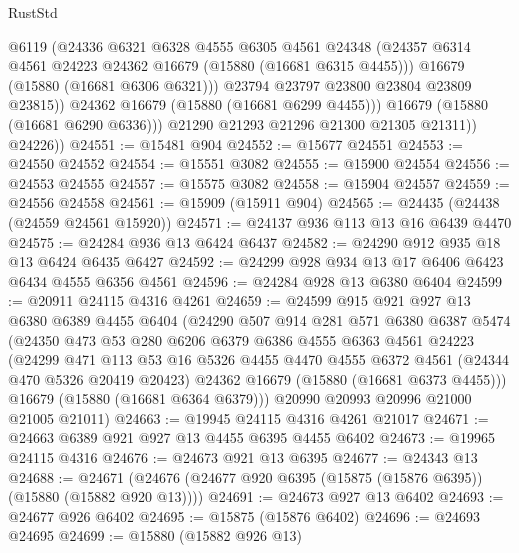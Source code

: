 \begin{lexlean}{RustStd}
\begin{coremodule}
                    @6119
                    (@24336
                      @6321
                      @6328
                      @4555
                      @6305
                      @4561
                      @24348
                      (@24357 @6314 @4561 @24223 @24362 @16679 (@15880 (@16681 @6315 @4455)))
                      @16679
                      (@15880 (@16681 @6306 @6321)))
                    @23794
                    @23797
                    @23800
                    @23804
                    @23809
                    @23815))
                @24362
                @16679
                (@15880 (@16681 @6299 @4455)))
              @16679
              (@15880 (@16681 @6290 @6336)))
            @21290
            @21293
            @21296
            @21300
            @21305
            @21311))
        @24226))
@24551 := @15481 @904
@24552 := @15677 @24551
@24553 := @24550 @24552
@24554 := @15551 @3082
@24555 := @15900 @24554
@24556 := @24553 @24555
@24557 := @15575 @3082
@24558 := @15904 @24557
@24559 := @24556 @24558
@24561 := @15909 (@15911 @904)
@24565 := @24435 (@24438 (@24559 @24561 @15920))
@24571 := @24137 @936 @113 @13 @16 @6439 @4470
@24575 := @24284 @936 @13 @6424 @6437
@24582 := @24290 @912 @935 @18 @13 @6424 @6435 @6427
@24592 := @24299 @928 @934 @13 @17 @6406 @6423 @6434 @4555 @6356 @4561
@24596 := @24284 @928 @13 @6380 @6404
@24599 := @20911 @24115 @4316 @4261
@24659 := @24599
    @915
    @921
    @927
    @13
    @6380
    @6389
    @4455
    @6404
    (@24290
      @507
      @914
      @281
      @571
      @6380
      @6387
      @5474
      (@24350
        @473
        @53
        @280
        @6206
        @6379
        @6386
        @4555
        @6363
        @4561
        @24223
        (@24299
          @471
          @113
          @53
          @16
          @5326
          @4455
          @4470
          @4555
          @6372
          @4561
          (@24344 @470 @5326 @20419 @20423)
          @24362
          @16679
          (@15880 (@16681 @6373 @4455)))
        @16679
        (@15880 (@16681 @6364 @6379)))
      @20990
      @20993
      @20996
      @21000
      @21005
      @21011)
@24663 := @19945 @24115 @4316 @4261 @21017
@24671 := @24663 @6389 @921 @927 @13 @4455 @6395 @4455 @6402
@24673 := @19965 @24115 @4316
@24676 := @24673 @921 @13 @6395
@24677 := @24343 @13
@24688 := @24671 (@24676 (@24677 @920 @6395 (@15875 (@15876 @6395)) (@15880 (@15882 @920 @13))))
@24691 := @24673 @927 @13 @6402
@24693 := @24677 @926 @6402
@24695 := @15875 (@15876 @6402)
@24696 := @24693 @24695
@24699 := @15880 (@15882 @926 @13)

\end{coremodule}
\end{lexlean}
